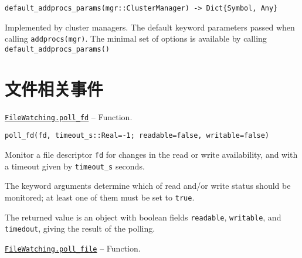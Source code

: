 \begin{adjustwidth}{2em}{0pt}


\begin{verbatim}
default_addprocs_params(mgr::ClusterManager) -> Dict{Symbol, Any}
\end{verbatim}

Implemented by cluster managers. The default keyword parameters passed when calling \texttt{addprocs(mgr)}. The minimal set of options is available by calling \texttt{default\_addprocs\_params()}



\end{adjustwidth}

\hypertarget{4477435705340973602}{}


\chapter{文件相关事件}


\hypertarget{4018465060202185434}{}
\hyperlink{4018465060202185434}{\texttt{FileWatching.poll\_fd}}  -- {Function.}

\begin{adjustwidth}{2em}{0pt}


\begin{verbatim}
poll_fd(fd, timeout_s::Real=-1; readable=false, writable=false)
\end{verbatim}

Monitor a file descriptor \texttt{fd} for changes in the read or write availability, and with a timeout given by \texttt{timeout\_s} seconds.

The keyword arguments determine which of read and/or write status should be monitored; at least one of them must be set to \texttt{true}.

The returned value is an object with boolean fields \texttt{readable}, \texttt{writable}, and \texttt{timedout}, giving the result of the polling.



\end{adjustwidth}
\hypertarget{16623395181067730756}{}
\hyperlink{16623395181067730756}{\texttt{FileWatching.poll\_file}}  -- {Function.}


